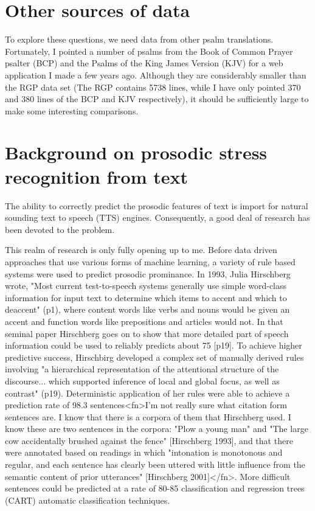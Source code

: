 \documentclass[12pt]{proposal}
\begin{document}
\section{Other sources of data}

To explore these questions, we need data from other psalm translations.
Fortunately, I pointed a number of psalms from the Book of Common Prayer psalter (BCP) and the Psalms of the King James Version (KJV) for a web application I made a few years ago.
Although they are considerably smaller than the RGP data set (The RGP contains 5738 lines, while I have only pointed 370 and 380 lines of the BCP and KJV respectively), it should be sufficiently large to make some interesting comparisons.


\section{Background on prosodic stress recognition from text}

The ability to correctly predict the prosodic features of text is import for natural sounding text to speech (TTS) engines.
Consequently, a good deal of research has been devoted to the problem.

This realm of research is only fully opening up to me. Before data driven
approaches that use various forms of machine learning, a variety of rule based
systems were used to predict prosodic prominance. In 1993, Julia Hirschberg
wrote, "Most current test-to-speech systems generally use simple word-class
information for input text to determine which items to accent and which to
deaccent" (p1), where content words like verbs and nouns would be given an
accent and function words like prepositions and articles would not. In that
seminal paper Hirschberg goes on to show that more detailed part of speech
information could be used to reliably predicts about 75%
[p19]. To achieve higher predictive success, Hirschbirg developed a complex set
of manually derived rules involving "a hierarchical representation of the
attentional structure of the discourse... which supported inference of local and
global focus, as well as contrast" (p19). Deterministic application of her rules
were able to achieve a prediction rate of 98.3%
sentences<fn>I'm not really sure what citation form sentences are. I know that
there is a corpora of them that Hirschberg used. I know these are two sentences
in the corpora: "Plow a young man" and "The large cow accidentally brushed
against the fence" [Hirschberg 1993], and that there were annotated based on
readings in which "intonation is monotonous and regular, and each sentence has
clearly been uttered with little influence from the semantic content of prior
utterances" [Hirschberg 2001]</fn>. More difficult sentences could be predicted
at a rate of 80-85%
classification and regression trees (CART) automatic classification techniques.
\end{document}
